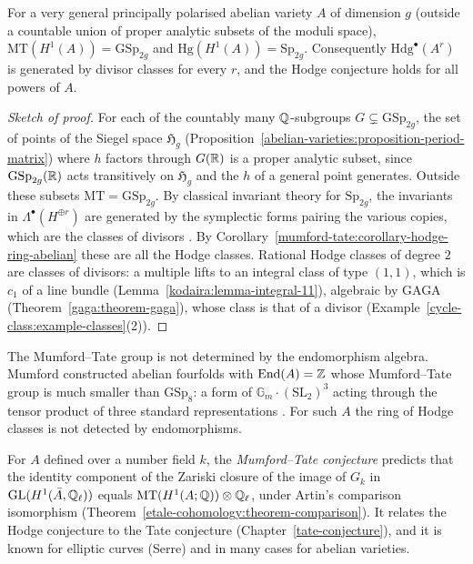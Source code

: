 \begin{theorem}\label{mumford-tate:theorem-very-general}
For a very general principally polarised abelian variety $A$ of dimension $g$ (outside a countable union of proper analytic subsets of the moduli space), $\mathrm{MT}(H^1(A)) = \mathrm{GSp}_{2g}$ and
$\mathrm{Hg}(H^1(A)) = \mathrm{Sp}_{2g}$. Consequently $\mathrm{Hdg}^\bullet(A^r)$ is generated by divisor classes for every $r$, and the Hodge conjecture holds for all powers of $A$.
\end{theorem}

\begin{proof}[Sketch of proof]
For each of the countably many $\mathbb{Q}$-subgroups $G \subsetneq \mathrm{GSp}_{2g}$, the set of points of the Siegel space $\mathfrak{H}_g$ (Proposition~\ref{abelian-varieties:proposition-period-matrix})
where $h$ factors through $G(\mathbb{R})$ is a proper analytic subset, since $\mathrm{GSp}_{2g}(\mathbb{R})$ acts transitively on $\mathfrak{H}_g$ and the $h$ of a general point generates. Outside these
subsets $\mathrm{MT} = \mathrm{GSp}_{2g}$. By classical invariant theory for $\mathrm{Sp}_{2g}$, the invariants in $\Lambda^\bullet(H^{\oplus r})$ are generated by the symplectic forms pairing the
various copies, which are the classes of divisors \cite{birkenhake-lange}. By Corollary~\ref{mumford-tate:corollary-hodge-ring-abelian} these are all the Hodge classes. Rational Hodge classes of
degree $2$ are classes of divisors: a multiple lifts to an integral class of type $(1,1)$, which is $c_1$ of a line bundle (Lemma~\ref{kodaira:lemma-integral-11}), algebraic by GAGA
(Theorem~\ref{gaga:theorem-gaga}), whose class is that of a divisor (Example~\ref{cycle-class:example-classes}(2)).
\end{proof}

\begin{remark}\label{mumford-tate:remark-mumford-example}
The Mumford--Tate group is not determined by the endomorphism algebra. Mumford constructed abelian fourfolds with $\operatorname{End}(A) = \mathbb{Z}$ whose Mumford--Tate group is much smaller than
$\mathrm{GSp}_8$: a form of $\mathbb{G}_m \cdot (\mathrm{SL}_2)^3$ acting through the tensor product of three standard representations \cite{mumford-1969}. For such $A$ the ring of Hodge
classes is not detected by endomorphisms.
\end{remark}

\begin{remark}\label{mumford-tate:remark-mumford-tate-conjecture}
For $A$ defined over a number field $k$, the \emph{Mumford--Tate conjecture} predicts that the identity component of the Zariski closure of the image of $G_k$ in $\mathrm{GL}(H^1(\bar A, \mathbb{Q}_\ell))$
equals $\mathrm{MT}(H^1(A; \mathbb{Q})) \otimes \mathbb{Q}_\ell$, under Artin's comparison isomorphism (Theorem~\ref{etale-cohomology:theorem-comparison}). It relates the Hodge conjecture to the Tate conjecture
(Chapter~\ref{tate-conjecture}), and it is known for elliptic curves (Serre) and in many cases for abelian varieties.
\end{remark}

